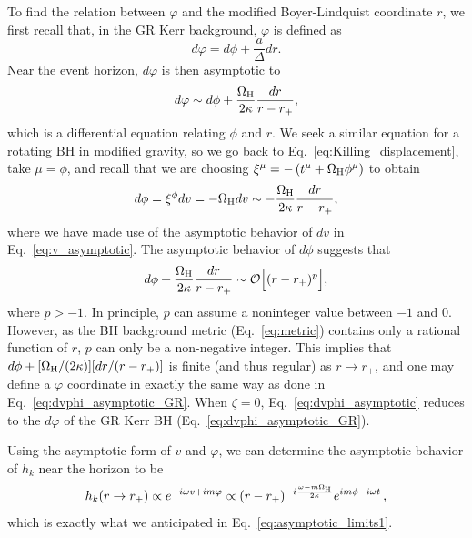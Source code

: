 \documentclass[aps,prx,amsmath,floats,floatfix,twocolumn,
  superscriptaddress,nofootinbib,showpacs]{revtex4-1}
\begin{document}
To find the relation between $\varphi$ and the modified Boyer-Lindquist coordinate $r$, we first recall that, in the GR Kerr background, $\varphi$ is defined as 
\begin{equation}
d\varphi = d\phi + \frac{a}{\Delta} dr. 
\end{equation}
Near the event horizon, $d\varphi$ is then asymptotic to 
\begin{equation}\label{eq:dvphi_asymptotic_GR}
d \varphi \sim d\phi + \frac{\Omega_{\rm H}}{2 \kappa} \frac{dr}{r-r_+}, 
\end{equation}
which is a differential equation relating $\phi$ and $r$. 
We seek a similar equation for a rotating BH in modified gravity, so we go back to Eq.~\eqref{eq:Killing_displacement}, take $\mu = \phi$, and recall that we are choosing $\xi^{\mu} = -\left(t^{\mu} + \Omega_{\rm H} \phi^{\mu}\right)$ to obtain
\begin{equation}
d \phi = \xi^{\phi} dv = - \Omega_{\rm H} dv \sim - \frac{\Omega_{\rm H}}{2 \kappa} \frac{dr}{r-r_+},  
\end{equation}
where we have made use of the asymptotic behavior of $dv$ in Eq.~\eqref{eq:v_asymptotic}. 
The asymptotic behavior of $d \phi$ suggests that 
\begin{equation}\label{eq:dvphi_asymptotic}
d \phi + \frac{\Omega_{\rm H}}{2 \kappa} \frac{dr}{r-r_+} \sim \mathcal{O}\Big[(r-r_+)^p \Big], 
\end{equation}
where $p > - 1$. 
In principle, $p$ can assume a noninteger value between $-1$ and 0. 
However, as the BH background metric (Eq.~\eqref{eq:metric}) contains only a rational function of $r$, $p$ can only be a non-negative integer. 
This implies that $d \phi + [{\Omega_{\rm H}}/({2 \kappa})] [{dr}/({r-r_+})]$ is finite (and thus regular) as $r \rightarrow r_+$, and one may define a $\varphi$ coordinate in exactly the same way as done in Eq.~\eqref{eq:dvphi_asymptotic_GR}. 
When $\zeta = 0$, Eq.~\eqref{eq:dvphi_asymptotic} reduces to the $d \varphi$ of the GR Kerr BH (Eq.~\eqref{eq:dvphi_asymptotic_GR}). 

Using the asymptotic form of $v$ and $\varphi$, we can determine the asymptotic behavior of $h_k$ near the horizon to be
\begin{equation}\label{eq:asymptotic_behaviour_EH_adv_time}
h_k (r \rightarrow r_+) \propto e^{-i \omega v + i m \varphi} \propto (r-r_+)^{-i\frac{\omega - m \Omega_{\rm H}}{2 \kappa}} e^{i m \phi - i \omega t}\,, 
\end{equation}
which is exactly what we anticipated in Eq.~\eqref{eq:asymptotic_limits1}.
\end{document}
